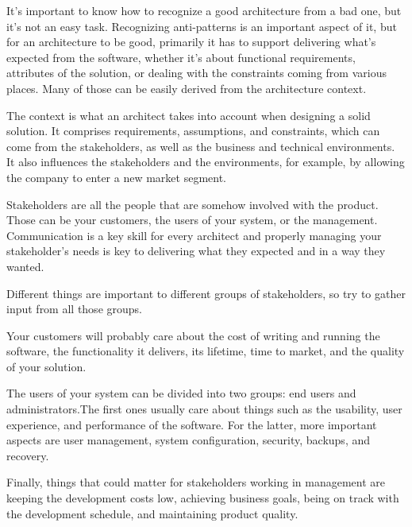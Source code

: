 
It's important to know how to recognize a good architecture from a bad one, but it's not an easy task. Recognizing anti-patterns is an important aspect of it, but for an architecture to be good, primarily it has to support delivering what's expected from the software, whether it's about functional requirements, attributes of the solution, or dealing with the constraints coming from various places. Many of those can be easily derived from the architecture context.


The context is what an architect takes into account when designing a solid solution. It comprises requirements, assumptions, and constraints, which can come from the stakeholders, as well as the business and technical environments. It also influences the stakeholders and the environments, for example, by allowing the company to enter a new market segment.


Stakeholders are all the people that are somehow involved with the product. Those can be your customers, the users of your system, or the management. Communication is a key skill for every architect and properly managing your stakeholder's needs is key to delivering what they expected and in a way they wanted.

Different things are important to different groups of stakeholders, so try to gather input from all those groups.

Your customers will probably care about the cost of writing and running the software, the functionality it delivers, its lifetime, time to market, and the quality of your solution.

The users of your system can be divided into two groups: end users and administrators.The first ones usually care about things such as the usability, user experience, and performance of the software. For the latter, more important aspects are user management, system configuration, security, backups, and recovery.

Finally, things that could matter for stakeholders working in management are keeping the development costs low, achieving business goals, being on track with the development schedule, and maintaining product quality.




